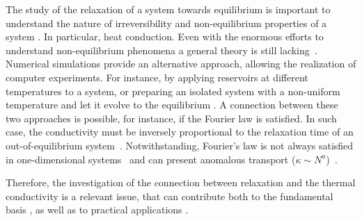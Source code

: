 \documentclass[aps,pre,showpacs,twocolumn,superscriptaddress,floatfix]{revtex4-1}
\begin{document}
 
The study of the relaxation of a system towards equilibrium is important   
to understand the nature of irreversibility and   
non-equilibrium properties of a system
\cite{Kardar2007statistical,Huang1987statistical,Kubo1992statistical,Gallavotti2008BoltzmannLegacy}. 
In particular, heat conduction.
%
%
Even with the enormous efforts to understand non-equilibrium phenomena
a general theory is still lacking~\cite{ReviewDhar2008,ReviewLepriLiviPoliti2003}. 
%
Numerical simulations provide an alternative approach, allowing the realization of 
computer experiments. For instance, by applying reservoirs at different
temperatures to a system, or preparing an isolated system  with a 
non-uniform temperature and let it evolve to the equilibrium 
\cite{ReviewBonettoLebowitzReyBellet2000}.
A connection between these two approaches is possible,
for instance, if the Fourier law is satisfied. 
In such case, the conductivity must be inversely proportional to
the relaxation time of an out-of-equilibrium system~\cite{Lampin2013}.
Notwithstanding, Fourier's law is not always satisfied in one-dimensional
systems~\cite{ReviewDhar2008,ReviewLepriLiviPoliti2003,OlivaresAnteneodo2016PRE} and can  present
anomalous transport ($\kappa \sim N^a$)~\cite{ProsenCampbell2000PRL}. 
%

Therefore, the investigation of the connection between relaxation and
the thermal conductivity is a relevant issue, that can contribute both 
to the fundamental basis \cite{Lepri1998PRE,GendelmanSavin2010PRE}, as well 
as to practical   applications \cite{ZaouiPallaCleriLampin2016PRB,Lampin2013}.
\end{document}
